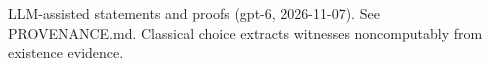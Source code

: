 \documentclass[11pt]{article}
\begin{document}

\bigskip
{\footnotesize LLM-assisted statements and proofs (gpt-6, 2026-11-07).
See PROVENANCE.md. Classical choice extracts witnesses noncomputably from existence evidence.}
\end{document}

